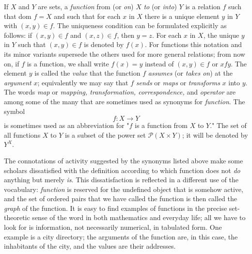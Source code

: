 
If $X$ and $Y$ are sets, a \textit{function} from (or \textit{on}) $X$ \textit{to} (or \textit{into}) $Y$ is a relation $f$ such that dom $f = X$ and such that for each $x$ in $X$ there is a unique element $y$ in $Y$ with $(x, y) \in f$. The uniqueness condition can be formulated explicitly as follows: if $(x, y) \in f$ and $(x, z) \in f$, then $y = z$. For each $x$ in $X$, the unique $y$ in $Y$ such that $(x, y) \in f$ is denoted by $f(x)$. For functions this notation and its minor variants supersede the others used for more general relations; from now on, if $f$ is a function, we shall write $f(x) = y$ instead of $(x, y) \in f$ or $x f y$. The element $y$ is called the \textit{value} that the function $f$ \textit{assumes} (or \textit{takes on}) at the \textit{argument} $x$; equivalently we may say that $f$ \textit{sends} or \textit{maps} or \textit{transforms} $x$ into $y$. The words \textit{map} or \textit{mapping, transformation, correspondence,} and \textit{operator} are among some of the many that are sometimes used as synonyms for \textit{function}. The symbol
\begin{equation*}
f: X \rightarrow Y
\end{equation*}
is sometimes used as an abbreviation for "$f$ is a function from $X$ to $Y$." The set of all functions $X$ to $Y$ is a subset of the power set $\mathcal{P}(X \times Y)$; it will be denoted by $Y^{X}$. 

The connotations of activity suggested by the synonyms listed above make some scholars dissatisfied with the definition according to which function does not \textit{do} anything but merely \textit{is}. This dissatisfaction is reflected in a different use of the vocabulary: \textit{function} is reserved for the undefined object that is somehow active, and the set of ordered pairs that we have called the function is then called the \textit{graph} of the function. It is easy to find examples of functions in the precise set-theoretic sense of the word in both mathematics and everyday life; all we have to look for is information, not necessarily numerical, in tabulated form. One example is a city directory; the arguments of the function are, in this case, the inhabitants of the city, and the values are their addresses. 

